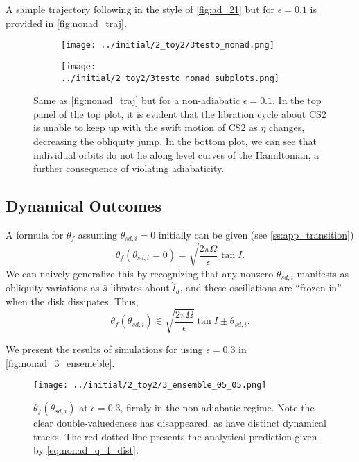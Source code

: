 \documentclass[
        fleqn,
        usenatbib,
    ]{mnras}
\newcommand*{\p}[1]{\left(#1\right)}
\begin{document}
A sample trajectory following in the style of \autoref{fig:ad_21} but for
$\epsilon = 0.1$ is provided in \autoref{fig:nonad_traj}.
\begin{figure}
    \centering
    \begin{subfigure}{\columnwidth}
        \centering
        \texttt{[image: ../initial/2\_toy2/3testo\_nonad.png]}
    \end{subfigure}
    \begin{subfigure}{\columnwidth}
        \centering
        \texttt{[image: ../initial/2\_toy2/3testo\_nonad\_subplots.png]}
    \end{subfigure}
    \caption{Same as \autoref{fig:nonad_traj} but for a non-adiabatic $\epsilon =
    0.1$. In the top panel of the top plot, it is evident that the libration
    cycle about CS2 is unable to keep up with the swift motion of CS2 as $\eta$
    changes, decreasing the obliquity jump. In the bottom plot, we can see that
    individual orbits do not lie along level curves of the Hamiltonian, a
    further consequence of violating adiabaticity.}\label{fig:nonad_traj}
\end{figure}

\subsection{Dynamical Outcomes}

A formula for $\theta_{f}$ assuming $\theta_{sd, i} = 0$ initially can be
given (see \autoref{ss:app_transition})
\begin{equation}
    \theta_{f}\p{\theta_{sd, i} = 0} = \sqrt{\frac{2\pi \Omega}{\epsilon}}
        \tan I.\label{eq:nonad_q_f}
\end{equation}
We can naively generalize this by recognizing that any nonzero $\theta_{sd, i}$
manifests as obliquity variations as $\hat{s}$ librates about $\hat{l}_d$, and
these oscillations are ``frozen in'' when the disk dissipates. Thus,
\begin{equation}
    \theta_{f}\p{\theta_{sd, i}} \in \sqrt{\frac{2\pi \Omega}{\epsilon}}
        \tan I \pm \theta_{sd, i}.\label{eq:nonad_q_f_dist}
\end{equation}

We present the results of simulations for using $\epsilon = 0.3$ in
\autoref{fig:nonad_3_ensemeble}.
\begin{figure}
    \centering
    \texttt{[image: ../initial/2\_toy2/3\_ensemble\_05\_05.png]}
    \caption{$\theta_{ f}\p{\theta_{sd, i}}$ at $\epsilon = 0.3$, firmly in
    the non-adiabatic regime. Note the clear double-valuedeness has disappeared,
    as have distinct dynamical tracks. The red dotted line presents the
    analytical prediction given by
    \autoref{eq:nonad_q_f_dist}.}\label{fig:nonad_3_ensemeble}
\end{figure}
\end{document}
